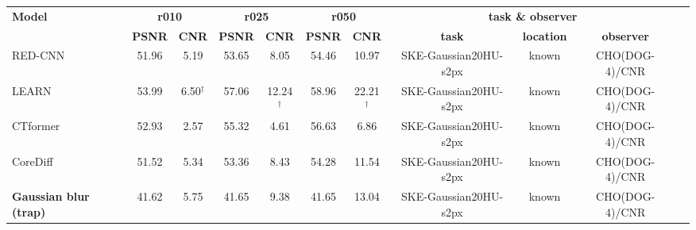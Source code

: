 \documentclass[twoside,11pt]{article}
\begin{document}
\begin{table}[ht]
    \centering
    \small
    \setlength{\tabcolsep}{4pt}
    \begin{tabular}{lcccccccccc}
        \toprule
        \multirow{2}{*}{\textbf{Model}} & \multicolumn{2}{c}{\textbf{r010}} & \multicolumn{2}{c}{\textbf{r025}} & \multicolumn{2}{c}{\textbf{r050}} & \multicolumn{3}{c}{\textbf{task \& observer}} \\
        \cmidrule(lr){2-3} \cmidrule(lr){4-5} \cmidrule(lr){6-7} \cmidrule(lr){8-10}
        & \textbf{PSNR} & \textbf{CNR} & \textbf{PSNR} & \textbf{CNR} & \textbf{PSNR} & \textbf{CNR} & \textbf{task} & \textbf{location} & \textbf{observer} \\
        \midrule
        RED-CNN   & 51.96 & 5.19 & 53.65 & 8.05 & 54.46 & 10.97 & SKE-Gaussian20HU-s2px & known & CHO(DOG-4)/CNR \\
        LEARN     & 53.99 & 6.50$^{\dagger}$ & 57.06 & 12.24$^{\dagger}$ & 58.96 & 22.21$^{\dagger}$ & SKE-Gaussian20HU-s2px & known & CHO(DOG-4)/CNR \\
        CTformer  & 52.93 & 2.57 & 55.32 & 4.61 & 56.63 & 6.86 & SKE-Gaussian20HU-s2px & known & CHO(DOG-4)/CNR \\
        CoreDiff  & 51.52 & 5.34 & 53.36 & 8.43 & 54.28 & 11.54 & SKE-Gaussian20HU-s2px & known & CHO(DOG-4)/CNR \\
        \textbf{Gaussian blur (trap)} & 41.62 & 5.75 & 41.65 & 9.38 & 41.65 & 13.04 & SKE-Gaussian20HU-s2px & known & CHO(DOG-4)/CNR \\
        \bottomrule
    \end{tabular}

\end{table}
\end{document}
